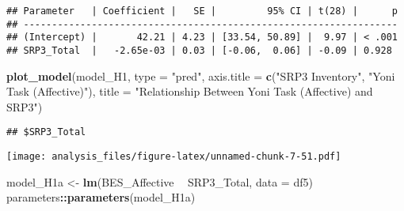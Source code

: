 \documentclass[
]{article}
\newenvironment{Shaded}{\begin{snugshade}}{\end{snugshade}}
\newcommand{\DataTypeTok}[1]{\textcolor[rgb]{0.13,0.29,0.53}{#1}}
\newcommand{\KeywordTok}[1]{\textcolor[rgb]{0.13,0.29,0.53}{\textbf{#1}}}
\newcommand{\NormalTok}[1]{#1}
\newcommand{\OperatorTok}[1]{\textcolor[rgb]{0.81,0.36,0.00}{\textbf{#1}}}
\newcommand{\StringTok}[1]{\textcolor[rgb]{0.31,0.60,0.02}{#1}}
\begin{document}
\begin{Shaded}
\end{Shaded}

\begin{verbatim}
## Parameter   | Coefficient |   SE |         95% CI | t(28) |      p
## ------------------------------------------------------------------
## (Intercept) |       42.21 | 4.23 | [33.54, 50.89] |  9.97 | < .001
## SRP3_Total  |   -2.65e-03 | 0.03 | [-0.06,  0.06] | -0.09 | 0.928
\end{verbatim}

\begin{Shaded}
\begin{Highlighting}[]
\KeywordTok{plot_model}\NormalTok{(model_H1, }\DataTypeTok{type =} \StringTok{"pred"}\NormalTok{, }\DataTypeTok{axis.title =} \KeywordTok{c}\NormalTok{(}\StringTok{"SRP3 Inventory"}\NormalTok{, }\StringTok{"Yoni Task (Affective)"}\NormalTok{), }\DataTypeTok{title =} \StringTok{"Relationship Between Yoni Task (Affective) and SRP3"}\NormalTok{)}
\end{Highlighting}
\end{Shaded}

\begin{verbatim}
## $SRP3_Total
\end{verbatim}

\texttt{[image: analysis\_files/figure-latex/unnamed-chunk-7-51.pdf]}

\begin{Shaded}
\begin{Highlighting}[]
\NormalTok{model_H1a <-}\StringTok{ }\KeywordTok{lm}\NormalTok{(BES_Affective }\OperatorTok{~}\StringTok{  }\NormalTok{SRP3_Total, }\DataTypeTok{data =}\NormalTok{ df5)}
\NormalTok{parameters}\OperatorTok{::}\KeywordTok{parameters}\NormalTok{(model_H1a)}
\end{Highlighting}
\end{Shaded}
\end{document}
